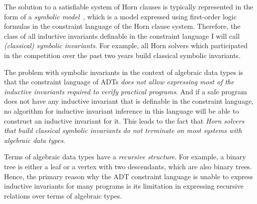 
The solution to a satisfiable system of Horn clauses is typically represented in the form of a \emph{symbolic model}~\cite{Bjorner2015}, which is a model expressed using first-order logic formulas in the constraint language of the Horn clause system.
Therefore, the class of all inductive invariants definable in the constraint language I will call \emph{(classical) symbolic invariants}.
For example, all Horn solvers which participated in the \chccomp{} competition over the past two years build classical symbolic invariants.

The problem with symbolic invariants in the context of algebraic data types is that the constraint language of ADTs \emph{does not allow expressing most of the inductive invariants required to verify practical programs}.
And if a safe program does not have any inductive invariant that is definable in the constraint language, no algorithm for inductive invariant inference in this language will be able to construct an inductive invariant for it.
This leads to the fact that \emph{Horn solvers that build classical symbolic invariants do not terminate on most systems with algebraic data types}.

Terms of algebraic data types have a \emph{recursive structure}. For example, a binary tree is either a leaf or a vertex with two descendants, which are also binary trees.
Hence, the primary reason why the ADT constraint language is unable to express inductive invariants for many programs is its limitation in expressing recursive relations over terms of algebraic types.

